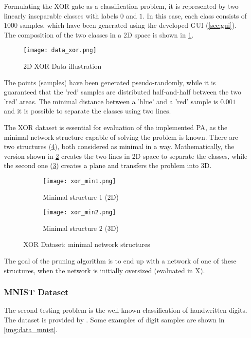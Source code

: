 Formulating the XOR gate as a classification problem, it is represented by two linearly inseparable classes with labels $ 0 $ and $ 1 $. In this case, each class consists of $ 1000 $ samples, which have been generated using the developed GUI (\cref{sec:gui}). The composition of the two classes in a 2D space is shown in \cref{img:data_xor}.

\begin{figure}[H]
  \centering
  \texttt{[image: data\_xor.png]}
  \caption{2D XOR Data illustration}
  \label{img:data_xor}
\end{figure}

The points (samples) have been generated pseudo-randomly, while it is guaranteed that the 'red' samples are distributed half-and-half between the two 'red' areas. The minimal distance between a 'blue' and a 'red' sample is $ 0.001 $ and it is possible to separate the classes using two lines.

The XOR dataset is essential for evaluation of the implemented PA, as the minimal network structure capable of solving the problem is known. There are two structures (\cref{img:xor_min}), both considered as minimal in a way. Mathematically, the version shown in \cref{img:xor_min1} creates the two lines in 2D space to separate the classes, while the second one (\cref{img:xor_min2}) creates a plane and transfers the problem into 3D.

\begin{figure}[H]
\centering
\begin{subfigure}{.5\textwidth}
  \centering
  \texttt{[image: xor\_min1.png]}
  \caption{Minimal structure 1 (2D)}
  \label{img:xor_min1}
\end{subfigure}%
\begin{subfigure}{.5\textwidth}
  \centering
  \texttt{[image: xor\_min2.png]}
  \caption{Minimal structure 2 (3D)}
  \label{img:xor_min2}
\end{subfigure}
\caption{XOR Dataset: minimal network structures}
\label{img:xor_min}
\end{figure}

The goal of the pruning algorithm is to end up with a network of one of these structures, when the network is initially oversized (evaluated in X).

\subsubsection*{MNIST Dataset}
The second testing problem is the well-known classification of handwritten digits. The dataset is provided by \citep{online:mnist}. Some examples of digit samples are shown in \cref{img:data_mnist}.

